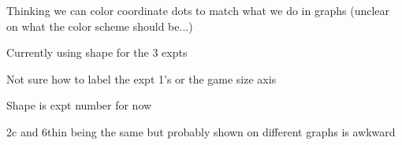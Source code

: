 \documentclass{article}
\begin{document}

Thinking we can color coordinate dots to match what we do in graphs (unclear on what the color scheme should be...)

Currently using shape for the 3 expts

Not sure how to label the expt 1's or the game size axis

Shape is expt number for now

2c and 6thin being the same but probably shown on different graphs is awkward
\end{document}
